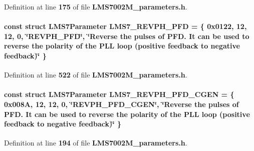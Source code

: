Definition at line {\bf 175} of file {\bf L\+M\+S7002\+M\+\_\+parameters.\+h}.

\paragraph[{L\+M\+S7\+\_\+\+R\+E\+V\+P\+H\+\_\+\+P\+FD}]{\setlength{\rightskip}{0pt plus 5cm}const struct {\bf L\+M\+S7\+Parameter} L\+M\+S7\+\_\+\+R\+E\+V\+P\+H\+\_\+\+P\+FD = \{ 0x0122, 12, 12, 0, \char`\"{}\+R\+E\+V\+P\+H\+\_\+\+P\+F\+D\char`\"{}, \char`\"{}\+Reverse the pulses of P\+F\+D. It can be used to reverse the polarity of the P\+L\+L loop (positive feedback to negative feedback)\char`\"{} \}\hspace{0.3cm}{\ttfamily [static]}}\label{LMS7002M__parameters_8h_ac5554390fe30098976714611daa275dd}


Definition at line {\bf 522} of file {\bf L\+M\+S7002\+M\+\_\+parameters.\+h}.

\paragraph[{L\+M\+S7\+\_\+\+R\+E\+V\+P\+H\+\_\+\+P\+F\+D\+\_\+\+C\+G\+EN}]{\setlength{\rightskip}{0pt plus 5cm}const struct {\bf L\+M\+S7\+Parameter} L\+M\+S7\+\_\+\+R\+E\+V\+P\+H\+\_\+\+P\+F\+D\+\_\+\+C\+G\+EN = \{ 0x008\+A, 12, 12, 0, \char`\"{}\+R\+E\+V\+P\+H\+\_\+\+P\+F\+D\+\_\+\+C\+G\+E\+N\char`\"{}, \char`\"{}\+Reverse the pulses of P\+F\+D. It can be used to reverse the polarity of the P\+L\+L loop (positive feedback to negative feedback)\char`\"{} \}\hspace{0.3cm}{\ttfamily [static]}}\label{LMS7002M__parameters_8h_a6558cac1d7e2e9601ec1564b072b29ac}


Definition at line {\bf 194} of file {\bf L\+M\+S7002\+M\+\_\+parameters.\+h}.

